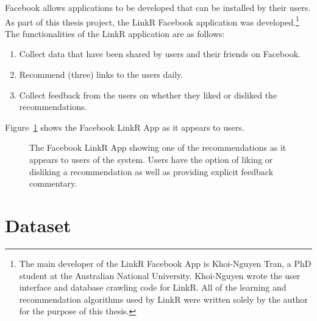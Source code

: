 Facebook allows applications to be developed that can be installed by
their users.  As part of this thesis project, the LinkR Facebook
application was developed.\footnote{The main developer of the LinkR
Facebook App is Khoi-Nguyen Tran, a PhD student at the Australian
National University.  Khoi-Nguyen wrote the user interface and database
crawling code for LinkR.  All of the learning and recommendation
algorithms used by LinkR were written solely by the author for the
purpose of this thesis.}  The functionalities of the LinkR application
are as follows:
\begin{enumerate}
\item{Collect data that have been shared by users and their friends on Facebook.}
\item{Recommend (three) links to the users daily.}
\item{Collect feedback from the users on whether they liked or disliked the recommendations.}
\end{enumerate}

Figure~\ref{fig:linkr_app} shows the Facebook LinkR App as it appears
to users.
\begin{figure}[t!]
\centering
\caption{The Facebook LinkR App showing one of the recommendations
as it appears to users of the system.  Users have the option of liking
or disliking a recommendation as well as providing explicit feedback
commentary.}
\label{fig:linkr_app}
\end{figure}

\section{Dataset}

